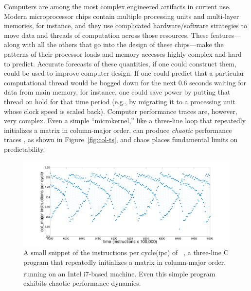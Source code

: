 Computers are among the most complex engineered artifacts in current
use.  Modern microprocessor chips contain multiple processing units
and multi-layer memories, for instance, and they use complicated
hardware/software strategies to move data and threads of computation
across those resources.  These features---along with all the others
that go into the design of these chips---make the patterns of their
processor loads and memory accesses highly complex and hard to
predict.  Accurate forecasts of these quantities, if one could
construct them, could be used to improve computer design.  If one
could predict that a particular computational thread would be bogged
down for the next 0.6 seconds waiting for data from main memory, for
instance, one could save power by putting that thread on hold for that
time period (e.g., by migrating it to a processing unit whose clock
speed is scaled back).  Computer performance traces are, however, very
complex.  Even a simple ``microkernel,'' like a three-line loop that
repeatedly initializes a matrix in column-major order, can produce
{\sl chaotic} performance traces \cite{mytkowicz09}, as shown in
Figure~\ref{fig:col-ts}, and chaos places fundamental limits on
predictability.
%
 \begin{figure}[htbp]
    \centering
    \includegraphics[width=\textwidth]{figs/colshortts}
    \caption{A small snippet of the instructions per cycle(ipc) of {\tt
        \col}, a three-line C program that repeatedly initializes
      a matrix in column-major order, running on an Intel i7\textsuperscript{\textregistered}-based machine.  Even this
      simple program exhibits chaotic performance dynamics.}
   \label{fig:ipc}
  \end{figure}









